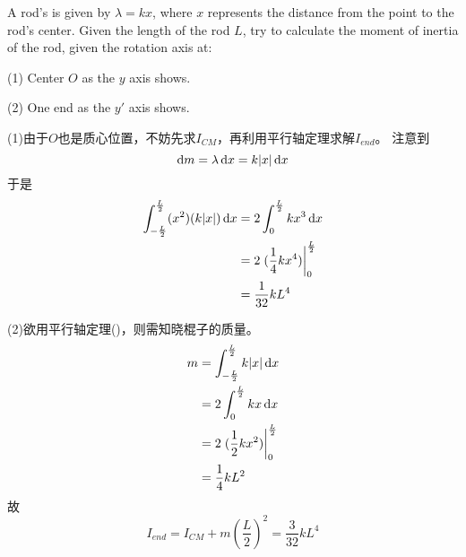 \begin{solution}
    A rod's  is given by $\lambda=kx$, where $x$ represents the distance from the point to the rod's center.
    Given the length of the rod $L$, try to calculate the moment of inertia of the rod, given the rotation axis at:

    (1) Center $O$ as the $y$ axis shows.

    (2) One end as the $y'$ axis shows.

    \tcbrule

    (1)由于$O$也是质心位置，不妨先求$I_{CM}$，再利用平行轴定理求解$I_{end}$。
    注意到
    \[\dif m=\lambda\dif x=k|x|\dif x\]
    于是
    \begin{align*}
        \int_{-\frac{L}{2}}^{\frac{L}{2}}(x^2)(k|x|)\dif x & =2\int_0^{\frac{L}{2}}kx^3\dif x                  \\
                                                           & =2\left.(\dfrac{1}{4}kx^4)\right|_0^{\frac{L}{2}} \\
                                                           & =\dfrac{1}{32}kL^4
    \end{align*}

    (2)欲用平行轴定理()，则需知晓棍子的质量。
    \begin{align*}
        m & =\int_{-\frac{L}{2}}^{\frac{L}{2}}k|x|\dif x      \\
          & =2\int_0^{\frac{L}{2}}kx\dif x                    \\
          & =2\left.(\dfrac{1}{2}kx^2)\right|_0^{\frac{L}{2}} \\
          & =\dfrac{1}{4}kL^2
    \end{align*}
    故
    \[I_{end}=I_{CM}+m(\dfrac{L}{2})^2=\dfrac{3}{32}kL^4\]
\end{solution}
